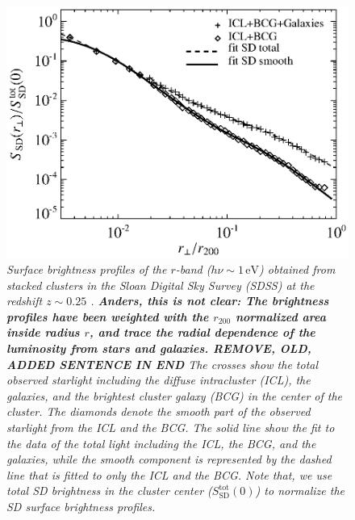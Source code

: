 \documentclass[10pt,aps,pra,reprint,amsmath,amsfonts,amssymb,showpacs,nofootinbib,floatfix]{revtex4-1}
\newcommand{\rmn}{\mathrm}
\newcommand{\sd}{\rmn{SD}}
\newcommand{\ev}{\rmn{eV}}
\newcommand{\rvir}{r_{200}}
\begin{document}
\begin{figure}%
 \includegraphics[width=0.99\columnwidth]{figures/SB.photon.eps}
 \caption{\it Surface brightness profiles of the $r$-band ($h\nu\sim
   1\,\ev$) obtained from stacked clusters in the Sloan Digital Sky
   Survey (SDSS) at the redshift $z \sim 0.25$
   \cite{2005MNRAS.358..949Z}. {\bf Anders, this is not clear: The
     brightness profiles have been weighted with the $\rvir$
     normalized area inside radius $r$, and trace the radial
     dependence of the luminosity from stars and galaxies. REMOVE,
     OLD, ADDED SENTENCE IN END} The crosses show the total observed
   starlight including the diffuse intracluster (ICL), the galaxies,
   and the brightest cluster galaxy (BCG) in the center of the
   cluster. The diamonds denote the smooth part of the observed
   starlight from the ICL and the BCG. The solid line show the fit to
   the data of the total light including the ICL, the BCG, and the
   galaxies, while the smooth component is represented by the dashed
   line that is fitted to only the ICL and the BCG. Note that, we use
   total SD brightness in the cluster center ($S_\sd^\rmn{tot}(0)$) to
   normalize the SD surface brightness profiles.}
 \label{fig:SD_spatial}
\end{figure}
\end{document}
